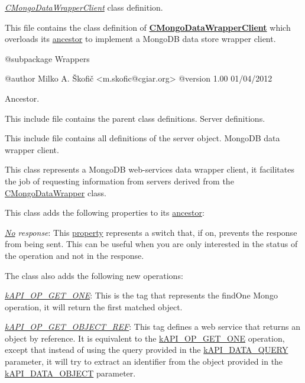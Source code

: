 {\itshape \hyperlink{class_c_mongo_data_wrapper_client}{C\-Mongo\-Data\-Wrapper\-Client}} class definition.

This file contains the class definition of {\bfseries \hyperlink{class_c_mongo_data_wrapper_client}{C\-Mongo\-Data\-Wrapper\-Client}} which overloads its \hyperlink{class_c_data_wrapper_client}{ancestor} to implement a Mongo\-D\-B data store wrapper client.

\begin{DoxyVerb}    @subpackage     Wrappers

    @author         Milko A. Škofič <m.skofic@cgiar.org>
    @version        1.00 01/04/2012\end{DoxyVerb}


Ancestor.

This include file contains the parent class definitions. Server definitions.

This include file contains all definitions of the server object. Mongo\-D\-B data wrapper client.

This class represents a Mongo\-D\-B web-\/services data wrapper client, it facilitates the job of requesting information from servers derived from the \hyperlink{class_c_mongo_data_wrapper}{C\-Mongo\-Data\-Wrapper} class.

This class adds the following properties to its \hyperlink{class_c_wrapper_client}{ancestor}\-:


\begin{DoxyItemize}
\item {\itshape \hyperlink{}{No} response}\-: This \hyperlink{}{property} represents a switch that, if on, prevents the response from being sent. This can be useful when you are only interested in the status of the operation and not in the response. 
\end{DoxyItemize}

The class also adds the following new operations\-:


\begin{DoxyItemize}
\item {\itshape \hyperlink{}{k\-A\-P\-I\-\_\-\-O\-P\-\_\-\-G\-E\-T\-\_\-\-O\-N\-E}}\-: This is the tag that represents the find\-One Mongo operation, it will return the first matched object. 
\item {\itshape \hyperlink{}{k\-A\-P\-I\-\_\-\-O\-P\-\_\-\-G\-E\-T\-\_\-\-O\-B\-J\-E\-C\-T\-\_\-\-R\-E\-F}}\-: This tag defines a web service that returns an object by reference. It is equivalent to the \hyperlink{}{k\-A\-P\-I\-\_\-\-O\-P\-\_\-\-G\-E\-T\-\_\-\-O\-N\-E} operation, except that instead of using the query provided in the \hyperlink{}{k\-A\-P\-I\-\_\-\-D\-A\-T\-A\-\_\-\-Q\-U\-E\-R\-Y} parameter, it will try to extract an identifier from the object provided in the \hyperlink{}{k\-A\-P\-I\-\_\-\-D\-A\-T\-A\-\_\-\-O\-B\-J\-E\-C\-T} parameter. 
\end{DoxyItemize}

